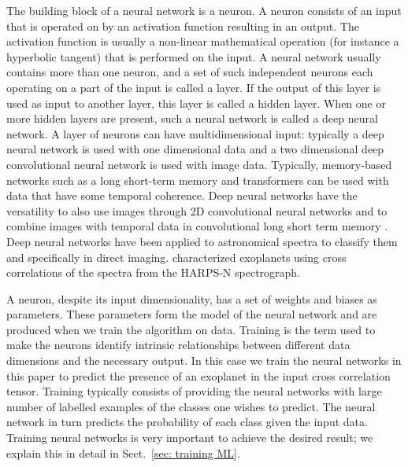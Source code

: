\documentclass{aa}
\begin{document}
The building block of a neural network is a neuron.
A neuron consists of an input that is operated on by an activation function resulting in an output.
The activation function is usually a non-linear mathematical operation (for instance a hyperbolic tangent) that is performed on the input.
A neural network usually contains more than one neuron, and a set of such independent neurons each operating on a part of the input is called a layer. 
If the output of this layer is used as input to another layer, this layer is called a hidden layer.
When one or more hidden layers are present, such a neural network is called a deep neural network.
A layer of neurons can have multidimensional input: typically a deep neural network is used with one dimensional data and a two dimensional deep convolutional neural network is used with image data.
Typically, memory-based networks such as a long short-term memory and transformers can be used with data that have some temporal coherence.
Deep neural networks have the versatility to also use images through 2D convolutional neural networks \citep[CNN,][]{shi2015convolutional} and to combine images with temporal data in convolutional long short term memory \citep[convLSTM,][]{1997HocherieterLSTM,2022convLSTM}.
Deep neural networks have been applied to astronomical spectra \citep[e.g.,][]{2019Leung,2020Tao} to classify them and specifically in direct imaging.
\citet{2020Fisher} characterized exoplanets using cross correlations of the spectra from the HARPS-N spectrograph.

A neuron, despite its input dimensionality, has a set of weights and biases as parameters. 
These parameters form the model of the neural network and are produced when we train the algorithm on data.
Training is the term used to make the neurons identify intrinsic relationships between different data dimensions and the necessary output.
In this case we train the neural networks in this paper to predict the presence of an exoplanet in the input cross correlation tensor.
Training typically consists of providing the neural networks with large number of labelled examples of the classes one wishes to predict.
The neural network in turn predicts the probability of each class given the input data.
Training neural networks is very important to achieve the desired result; we explain this in detail in Sect.~\ref{sec: training ML}.
\end{document}

